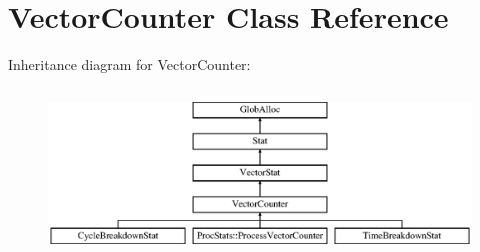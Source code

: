 \hypertarget{classVectorCounter}{\section{Vector\-Counter Class Reference}
\label{classVectorCounter}
}
Inheritance diagram for Vector\-Counter\-:\begin{figure}[H]
\begin{center}
\leavevmode
\includegraphics[height=4.465710cm]{classVectorCounter}
\end{center}
\end{figure}
